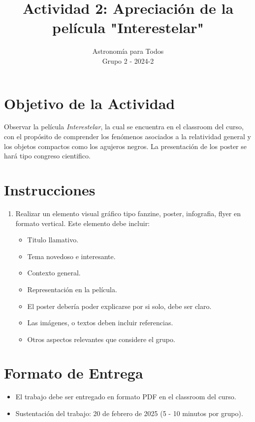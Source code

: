 \documentclass[12pt]{article}
\title{Actividad 2: Apreciación de la película "Interestelar"}
\author{Astronomía para Todos \\ Grupo 2 - 2024-2}
\date{}
\begin{document}
\maketitle

\section*{Objetivo de la Actividad}

Observar la película \textit{Interestelar}, la cual se encuentra en el classroom del curso, con el propósito de comprender los fenómenos asociados a la relatividad general  y los objetos compactos como los agujeros negros.
La presentación de los poster se hará tipo congreso cientifico.

\section*{Instrucciones}

\begin{enumerate}
    \item Realizar un elemento visual gráfico tipo fanzine, poster, infografia, flyer en formato vertical. Este elemento debe incluir:
    \begin{itemize}
        \item Titulo llamativo.
        \item Tema novedoso e interesante.
        \item Contexto general.
        \item Representación en la película.
        \item El poster debería poder explicarse por si solo, debe ser claro.
        \item Las imágenes, o textos deben incluir referencias.
        \item Otros aspectos relevantes que considere el grupo.
    \end{itemize}
\end{enumerate}

\section*{Formato de Entrega}

\begin{itemize}
    \item El trabajo debe ser entregado en formato PDF en el classroom del curso.
    \item Sustentación del trabajo: 20 de febrero de 2025 (5 - 10 minutos por grupo).
\end{itemize}
\end{document}
